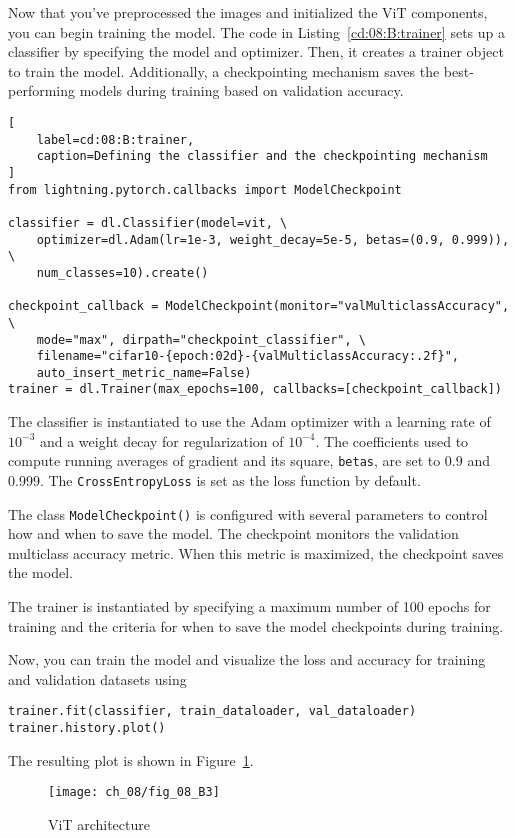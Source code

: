 Now that you've preprocessed the images and initialized the ViT components, you can begin training the model.  The code in Listing~\ref{cd:08:B:trainer} sets up a classifier by specifying the model and optimizer. Then, it creates a trainer object to train the model. Additionally, a checkpointing mechanism saves the best-performing models during training based on validation accuracy.

\begin{lstlisting}[
    label=cd:08:B:trainer,
    caption=Defining the classifier and the checkpointing mechanism
]
from lightning.pytorch.callbacks import ModelCheckpoint

classifier = dl.Classifier(model=vit, \
    optimizer=dl.Adam(lr=1e-3, weight_decay=5e-5, betas=(0.9, 0.999)), \
    num_classes=10).create()

checkpoint_callback = ModelCheckpoint(monitor="valMulticlassAccuracy", \
    mode="max", dirpath="checkpoint_classifier", \
    filename="cifar10-{epoch:02d}-{valMulticlassAccuracy:.2f}",
    auto_insert_metric_name=False)
trainer = dl.Trainer(max_epochs=100, callbacks=[checkpoint_callback])
\end{lstlisting}
The classifier is instantiated to use the Adam optimizer with a learning rate of $10^{-3}$ and a weight decay for regularization of $10^{-4}$. The coefficients used to compute running averages of gradient and its square, \lstinline{betas}, are set to 0.9 and 0.999. The \lstinline{CrossEntropyLoss} is set as the loss function by default.

The class \lstinline{ModelCheckpoint()} is configured with several parameters to control how and when to save the model. The checkpoint monitors the validation multiclass accuracy metric. When this metric is maximized, the checkpoint saves the model.

The trainer is instantiated by specifying a maximum number of 100 epochs for training and the criteria for when to save the model checkpoints during training.

Now, you can train the model and visualize the loss and accuracy for training and validation datasets using
\begin{lstlisting}
trainer.fit(classifier, train_dataloader, val_dataloader)
trainer.history.plot()
\end{lstlisting}
The resulting plot is shown in Figure~\ref{fig:08:B:3}.

\begin{figure}[H]
    \texttt{[image: ch\_08/fig\_08\_B3]}
    \caption{ViT architecture}
    \label{fig:08:B:3}
\end{figure}

